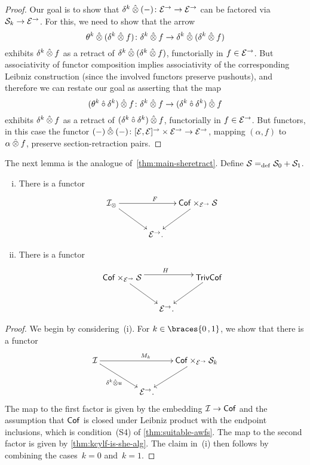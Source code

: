 \documentclass[reqno,10pt,a4paper,oneside,draft]{amsart}
\begin{document}
{{\begin{proof}
Our goal is to show that $\delta^k \hatotimes (-) \co \cal{E}^\to \to \cal{E}^\to$ can be factored via $\cal{S}_k \to \cal{E}^\to$.
For this, we need to show
that the arrow
\[
\theta^k \hatotimes (\delta^k \hatotimes f) \co \delta^k \hatotimes f \to \delta^k \hatotimes (\delta^k \hatotimes f)
\]
exhibits $\delta^k \hatotimes f$ as a retract of $\delta^k \hatotimes (\delta^k \hatotimes f)$, functorially in $f \in \cal{E}^\to$.
But associativity of functor composition implies associativity of the corresponding Leibniz construction (since the involved functors preserve pushouts), and therefore we can restate our goal as asserting that the map
\[
(\theta^k \mathbin{\hat{\cc}} \delta^k) \hatotimes f \co \delta^k \hatotimes f \to (\delta^k \mathbin{\hat{\cc}} \delta^k) \hatotimes f
\]
exhibits $\delta^k \hatotimes f$ as a retract of $(\delta^k \mathbin{\hat{\cc}} \delta^k) \hatotimes f$, functorially in $f \in \cal{E}^\to$.
But functors, in this case the functor $(-) \hatotimes (-) \co [\cal{E}, \cal{E}]^\to \times \cal{E}^\to \to \cal{E}^\to$,
mapping $(\alpha, f)$ to $\alpha \hatotimes f$, preserve section-retraction pairs.
\end{proof}

The next lemma is the analogue of~\cref{thm:main-sheretract}.
Define $\cal{S} \defeq  \cal{S}_0 + \cal{S}_1$.

\begin{proposition} \label{thm:strong-hequiv} \leavevmode
\begin{enumerate}[(i)]
\item \label{thm:onedir} There is a functor
\[
\xymatrix@!C@C-2.5em{
  \cal{I}_\otimes
  \ar[dr]
  \ar[rr]^F
&&
  \Cof \times_{\cal{E}^\to} \cal{S}
  \ar[dl]
\\&
  \catE^\to
\rlap{.}}
\]
\item \label{thm:twodir} There is a functor
\[
\xymatrix@!C@C-2.5em{
  \Cof \times_{\cal{E}^\to} \cal{S}
  \ar[dr]
  \ar@<4pt>[rr]^{H}
&&
  \TrivCof
  \ar[dl]
\\&
  \catE^\to
\rlap{.}}
\]
\end{enumerate}
\end{proposition}

\begin{proof}
We begin by considering~(i). For $k \in \braces{0 \, , 1}$, we show that there is a functor
\[
\xymatrix@!C@C-2em{
  \cal{I}
  \ar[dr]_{\kcyl \hatotimes u} \ar[rr]^{M_k}
&&
  \Cof \times_{\cal{E}^\to} \cal{S}_k
  \ar[dl]
\\&
   \catE^\to
\rlap{.}}
\]
The map to the first factor is given by the embedding $\cal{I} \to \Cof$ and the assumption that $\Cof$ is closed under Leibniz product with the endpoint inclusions, which is condition~(S4) of \cref{thm:suitable-awfs}.
The map to the second factor is given by \cref{thm:kcylf-is-she-alg}.
The claim in~(i) then follows by combining the cases~$k = 0$ and~$k = 1$.


\end{proof}}}
\end{document}
